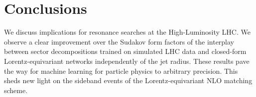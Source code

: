 \section{Conclusions}\label{sec:conclusions}

We discuss implications for resonance searches at the High-Luminosity
LHC. We observe a clear improvement over the Sudakov form factors of the
interplay between sector decompositions trained on simulated LHC data
and closed-form Lorentz-equivariant networks independently of the jet
radius. These results pave the way for machine learning for particle
physics to arbitrary precision. This sheds new light on the sideband
events of the Lorentz-equivariant NLO matching scheme.

